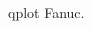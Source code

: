 \documentclass[a4paper,12pt]{article}
\begin{document}
\begin{figure}[H]
    \centering
    \begin{adjustbox}{scale = 0.65, max width=\columnwidth}
    \end{adjustbox}
    \caption{qplot Fanuc.}
    \label{qplot fanuc}
\end{figure}




\end{document}
